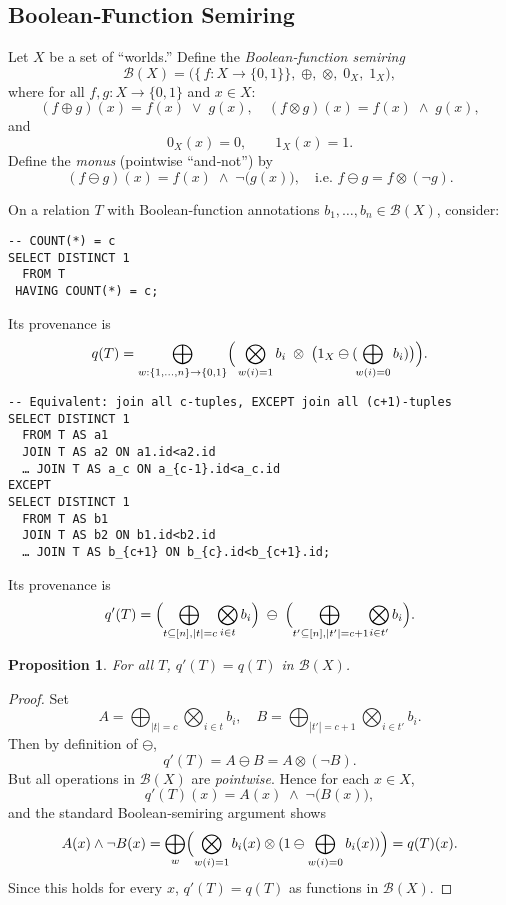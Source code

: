 \documentclass{article}
\newtheorem{proposition}{Proposition}
\begin{document}
\subsection*{Boolean‐Function Semiring}

Let \(X\) be a set of “worlds.”  Define the \emph{Boolean‐function semiring}
\[
  \mathcal{B}(X)
  = \bigl(\{\,f : X \to \{0,1\}\},\;\oplus,\;\otimes,\;0_X,\;1_X\bigr),
\]
where for all \(f,g: X\to\{0,1\}\) and \(x\in X\):
\[
  (f\oplus g)(x) = f(x)\;\vee\;g(x),
  \quad
  (f\otimes g)(x) = f(x)\;\wedge\;g(x),
\]
and
\[
  0_X(x)=0,\qquad 1_X(x)=1.
\]
Define the \emph{monus} (pointwise ``and‐not'') by
\[
  (f\ominus g)(x)
  = f(x)\;\wedge\;\neg\bigl(g(x)\bigr),
  \quad
  \text{i.e.\ }f\ominus g = f\otimes(\neg g).
\]

\medskip
On a relation \(T\) with Boolean‐function annotations \(b_1,\dots,b_n\in\mathcal{B}(X)\), consider:

\begin{verbatim}
-- COUNT(*) = c
SELECT DISTINCT 1
  FROM T
 HAVING COUNT(*) = c;
\end{verbatim}

Its provenance is
\[
  q(T)
  = \bigoplus_{w:\{1,\dots,n\}\to\{0,1\}}
    \Bigl(\,\bigotimes_{w(i)=1}b_i
           \;\otimes\;
           \bigl(1_X\ominus(\!\bigoplus_{w(i)=0}b_i)\bigr)
    \Bigr).
\]

\begin{verbatim}
-- Equivalent: join all c‐tuples, EXCEPT join all (c+1)‐tuples
SELECT DISTINCT 1
  FROM T AS a1
  JOIN T AS a2 ON a1.id<a2.id 
  … JOIN T AS a_c ON a_{c-1}.id<a_c.id
EXCEPT
SELECT DISTINCT 1
  FROM T AS b1
  JOIN T AS b2 ON b1.id<b2.id 
  … JOIN T AS b_{c+1} ON b_{c}.id<b_{c+1}.id;
\end{verbatim}

Its provenance is
\[
  q'(T)
  = \Bigl(\!\bigoplus_{\,t\subseteq[n],|t|=c}\!\bigotimes_{i\in t}b_i\Bigr)
    \;\ominus\;
    \Bigl(\!\bigoplus_{\,t'\subseteq[n],|t'|=c+1}\!\bigotimes_{i\in t'}b_i\Bigr).
\]

\begin{proposition}
For all \(T\), \(q'(T)=q(T)\) in \(\mathcal{B}(X)\).
\end{proposition}

\begin{proof}
Set
\[
  A = \bigoplus_{|t|=c}\bigotimes_{i\in t}b_i,
  \quad
  B = \bigoplus_{|t'|=c+1}\bigotimes_{i\in t'}b_i.
\]
Then by definition of \(\ominus\),
\[
  q'(T) = A \ominus B = A \otimes (\neg B).
\]
But all operations in \(\mathcal{B}(X)\) are \emph{pointwise}.  Hence for each \(x\in X\),
\[
  q'(T)(x)
  = A(x)\;\wedge\;\neg\bigl(B(x)\bigr),
\]
and the standard Boolean‐semiring argument shows
\[
  A(x)\wedge\neg B(x)
  = \bigoplus_{w}\Bigl(\bigotimes_{w(i)=1}b_i(x)
                      \otimes
                      (1\ominus\bigoplus_{w(i)=0}b_i(x))\Bigr)
  = q(T)(x).
\]
Since this holds for every \(x\), \(q'(T)=q(T)\) as functions in \(\mathcal{B}(X)\).
\end{proof}
\end{document}
